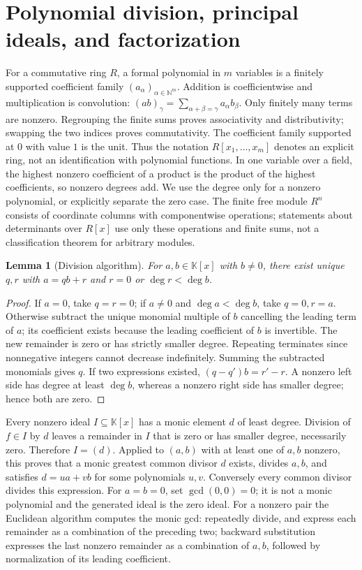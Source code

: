 \documentclass[11pt,a4paper]{book}
\newtheorem{lemma}[theorem]{Lemma}
\theoremstyle{definition}\newtheorem{definition}[theorem]{Definition}
\theoremstyle{remark}\newtheorem{remark}[theorem]{Remark}
\newcommand{\K}{\mathbb K}\newcommand{\R}{\mathbb R}\newcommand{\C}{\mathbb C}
\newcommand{\N}{\mathbb N}\newcommand{\Z}{\mathbb Z}
\begin{document}
\section{Polynomial division, principal ideals, and factorization}
For a commutative ring $R$, a formal polynomial in $m$ variables is a finitely supported coefficient family $(a_\alpha)_{\alpha\in\N^m}$. Addition is coefficientwise and multiplication is convolution:
$(ab)_\gamma=\sum_{\alpha+\beta=\gamma}a_\alpha b_\beta$.
Only finitely many terms are nonzero. Regrouping the finite sums proves associativity and distributivity; swapping the two indices proves commutativity. The coefficient family supported at $0$ with value $1$ is the unit. Thus the notation $R[x_1,\ldots,x_m]$ denotes an explicit ring, not an identification with polynomial functions. In one variable over a field, the highest nonzero coefficient of a product is the product of the highest coefficients, so nonzero degrees add. We use the degree only for a nonzero polynomial, or explicitly separate the zero case. The finite free module $R^n$ consists of coordinate columns with componentwise operations; statements about determinants over $R[x]$ use only these operations and finite sums, not a classification theorem for arbitrary modules.

\begin{lemma}[Division algorithm]\label{aux:polynomial-division}
For $a,b\in\K[x]$ with $b\ne0$, there exist unique $q,r$ with $a=qb+r$ and $r=0$ or $\deg r<\deg b$.
\end{lemma}
\begin{proof}
If $a=0$, take $q=r=0$; if $a\ne0$ and $\deg a<\deg b$, take $q=0,r=a$. Otherwise subtract the unique monomial multiple of $b$ cancelling the leading term of $a$; its coefficient exists because the leading coefficient of $b$ is invertible. The new remainder is zero or has strictly smaller degree. Repeating terminates since nonnegative integers cannot decrease indefinitely. Summing the subtracted monomials gives $q$. If two expressions existed, $(q-q')b=r'-r$. A nonzero left side has degree at least $\deg b$, whereas a nonzero right side has smaller degree; hence both are zero.
\end{proof}

Every nonzero ideal $I\subseteq\K[x]$ has a monic element $d$ of least degree. Division of $f\in I$ by $d$ leaves a remainder in $I$ that is zero or has smaller degree, necessarily zero. Therefore $I=(d)$. Applied to $(a,b)$ with at least one of $a,b$ nonzero, this proves that a monic greatest common divisor $d$ exists, divides $a,b$, and satisfies $d=ua+vb$ for some polynomials $u,v$. Conversely every common divisor divides this expression. For $a=b=0$, set $\gcd(0,0)=0$; it is not a monic polynomial and the generated ideal is the zero ideal. For a nonzero pair the Euclidean algorithm computes the monic gcd: repeatedly divide, and express each remainder as a combination of the preceding two; backward substitution expresses the last nonzero remainder as a combination of $a,b$, followed by normalization of its leading coefficient.
\end{document}
